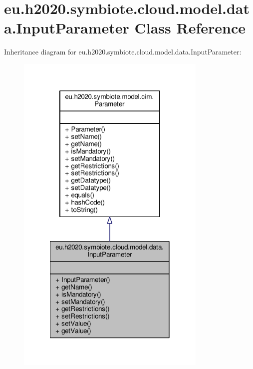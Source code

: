 \hypertarget{classeu_1_1h2020_1_1symbiote_1_1cloud_1_1model_1_1data_1_1InputParameter}{}\section{eu.\+h2020.\+symbiote.\+cloud.\+model.\+data.\+Input\+Parameter Class Reference}
\label{classeu_1_1h2020_1_1symbiote_1_1cloud_1_1model_1_1data_1_1InputParameter}


Inheritance diagram for eu.\+h2020.\+symbiote.\+cloud.\+model.\+data.\+Input\+Parameter\+:\nopagebreak
\begin{figure}[H]
\begin{center}
\leavevmode
\includegraphics[width=258pt]{classeu_1_1h2020_1_1symbiote_1_1cloud_1_1model_1_1data_1_1InputParameter__inherit__graph}
\end{center}
\end{figure}


